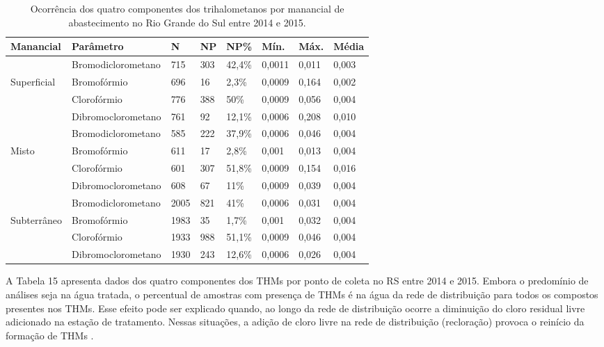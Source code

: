 \begin{table}[!htb]
\begin{flushleft}
\small
\caption{\small Ocorrência dos quatro componentes dos trihalometanos por manancial de abastecimento no Rio Grande do Sul entre 2014 e 2015.} \label{tab:com_esp}
\centering
\begin{tabular}{p{2cm}p{3.2cm}p{1cm}p{0.6cm}p{1.2cm}p{1cm}p{1cm}p{1cm}}
\toprule
\textbf{Manancial}  & \textbf{Parâmetro}& \textbf{N} & \textbf{NP} & \textbf{NP\%} &  \textbf{Mín.}  & \textbf{Máx.} & \textbf{Média} 
 \\
\midrule
& Bromodiclorometano & 715 & 303 & 42,4\% & 0,0011 & 0,011 & 0,003\\
Superficial & Bromofórmio & 696 & 16 & 2,3\% & 0,0009 & 0,164 & 0,002\\
& Clorofórmio & 776 & 388 & 50\% & 0,0009 & 0,056 & 0,004\\
& Dibromoclorometano & 761 & 92 & 12,1\% & 0,0006 & 0,208 & 0,010\\\hline

& Bromodiclorometano & 585 & 222 & 37,9\% & 0,0006 & 0,046 & 0,004\\
Misto & Bromofórmio & 611 & 17 & 2,8\% & 0,001 & 0,013 & 0,004\\
& Clorofórmio & 601 & 307 & 51,8\% & 0,0009 & 0,154 & 0,016\\
& Dibromoclorometano & 608 & 67 & 11\% & 0,0009 & 0,039 & 0,004\\
\hline
& Bromodiclorometano & 2005 & 821 & 41\% & 0,0006 & 0,031 & 0,004\\
Subterrâneo & Bromofórmio & 1983 & 35 & 1,7\% & 0,001 & 0,032 & 0,004\\
& Clorofórmio & 1933 & 988 & 51,1\% & 0,0009 & 0,046 & 0,004\\
& Dibromoclorometano & 1930 & 243 & 12,6\% & 0,0006 & 0,026 & 0,004\\

\bottomrule
\end{tabular}
\end{flushleft}
\end{table}

\newpage
A Tabela 15 apresenta dados dos quatro componentes dos THMs por ponto de coleta no RS entre 2014 e 2015. Embora o predomínio de análises seja na água tratada, o percentual de amostras com  presença de THMs é na água da rede de distribuição para todos os compostos presentes nos THMs. Esse efeito pode ser explicado quando, ao longo da rede de distribuição ocorre a diminuição do cloro residual livre adicionado na estação de tratamento. Nessas situações, a adição de cloro livre na rede de distribuição (recloração) provoca o reinício da formação de THMs \cite{mouly2010variations}.



